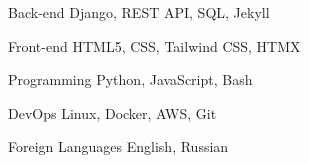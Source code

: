 
\begin{cvskills}

  \cvskill
  {Back-end} %
  {Django, REST API, SQL, Jekyll} %

  \cvskill
  {Front-end} %
  {HTML5, CSS, Tailwind CSS, HTMX} %

  \cvskill
  {Programming} %
  {Python, JavaScript, Bash} %

  \cvskill
  {DevOps} %
  {Linux, Docker, AWS, Git} %

  \cvskill
  {Foreign Languages} %
  {English, Russian} %

\end{cvskills}
